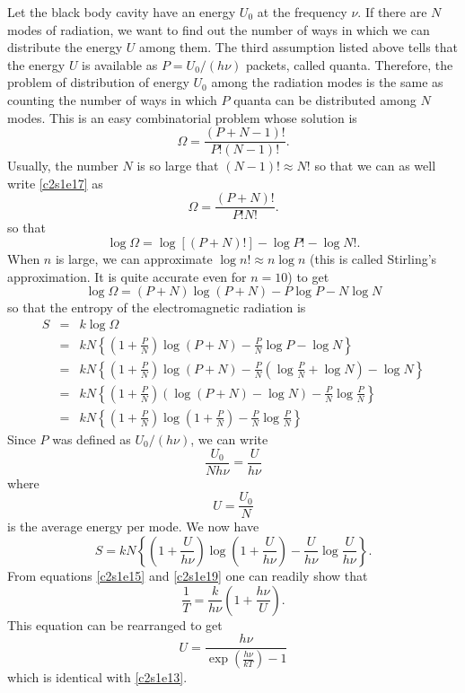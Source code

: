 Let the black body cavity have an energy $U_0$ at the frequency $\nu$. If there 
are $N$ modes of radiation, we want to find out the number of ways in which we 
can  distribute the energy $U$ among them. The third assumption listed above 
tells  that the energy $U$ is available as $P=U_0/(h\nu)$ packets, called quanta. 
Therefore, the problem of distribution of energy $U_0$ among the radiation modes
is the same as counting the number of ways in which $P$ quanta can be 
distributed among $N$ modes. This is an easy combinatorial problem whose 
solution is
\begin{equation}\label{c2s1e17}
\Omega = \frac{(P + N - 1)!}{P!(N - 1)!}.
\end{equation}
Usually, the number $N$ is so large that $(N - 1)! \approx N!$ so that we can
as well write \eqref{c2s1e17} as
\begin{equation}\label{c2e1e18}
\Omega = \frac{(P + N)!}{P!N!}.
\end{equation}
so that
\[
\log\Omega = \log[(P + N)!] - \log P! - \log N!.
\]
When $n$ is large, we can approximate $\log n! \approx n\log n$ (this is called
Stirling's approximation. It is quite accurate even for $n = 10$) to get
\[
\log\Omega = (P + N)\log(P + N) - P\log P - N\log N
\]
so that the entropy of the electromagnetic radiation is
\begin{eqnarray*}
S &=& k\log\Omega \\
  &=& kN\left\{\left(1 + \frac{P}{N}\right)\log(P + N) - \frac{P}{N}
      \log P - \log N\right\} \\
 &=& kN\left\{\left(1 + \frac{P}{N}\right)\log(P+N) - \frac{P}{N}
     \left(\log\frac{P}{N} + \log N\right) - \log N\right\} \\
 &=& kN\left\{\left(1 + \frac{P}{N}\right)\left(\log(P+N)-\log N\right)
     - \frac{P}{N}\log\frac{P}{N}\right\} \\
 &=& kN\left\{\left(1 + \frac{P}{N}\right)\log\left(1+\frac{P}{N}\right)
     - \frac{P}{N}\log\frac{P}{N}\right\}
\end{eqnarray*}
Since $P$ was defined as $U_0/(h\nu)$, we can write
\[
\frac{U_0}{Nh\nu} = \frac{U}{h\nu}
\]
where
\begin{equation}\label{c2s1e19}
U = \frac{U_0}{N}
\end{equation}
is the average energy per mode. We now have
\begin{equation}\label{c2s1e20}
S = kN\left\{\left(1 + \frac{U}{h\nu}\right)\log\left(1+\frac{U}{h\nu}\right)
     - \frac{U}{h\nu}\log\frac{U}{h\nu}\right\}.
\end{equation}     
From equations \eqref{c2s1e15} and \eqref{c2s1e19} one can readily show that
\begin{equation}\label{c2s1e21}
\frac{1}{T} = \frac{k}{h\nu}\left(1 + \frac{h\nu}{U}\right).
\end{equation}
This equation can be rearranged to get
\begin{equation}\label{c2s1e22}
U = \frac{h\nu}{\exp\left(\frac{h\nu}{kT}\right) - 1}
\end{equation}
which is identical with \eqref{c2s1e13}.

